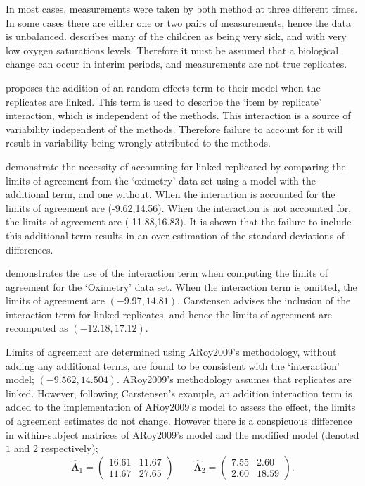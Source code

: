 \documentclass[12pt, a4paper]{report}
\theoremstyle{plain}
\theoremstyle{definition}
\theoremstyle{remark}
\begin{document}
	In most cases, measurements were taken by both method at three different times. In some cases there are either one or two pairs of measurements, hence the data is unbalanced. \citet{BXC2008} describes many of the children as being very sick, and with very low oxygen saturations levels. Therefore it must be assumed that a biological change can occur in interim periods, and measurements are not true replicates.
	
	\citet{BXC2008} proposes the addition of an random effects term to their model when the replicates are linked. This term is used to describe the `item by replicate' interaction, which is independent of the methods. This interaction is a source of variability independent of the methods. Therefore failure to account for it will result in variability being wrongly attributed to the methods.
	
	
	\citet{BXC2008} demonstrate the necessity of accounting for linked replicated by comparing the limits of agreement from the `oximetry' data set using a model with the additional term, and one without. When the interaction is accounted for the limits of agreement are (-9.62,14.56). When the interaction is not accounted for, the limits of agreement are (-11.88,16.83). It is shown that the failure to include this additional term results in an over-estimation of the standard deviations of differences.
	
	
	\citet{BXC2008} demonstrates the use of the interaction term when computing the limits of agreement for the `Oximetry' data set. When the interaction term is omitted, the limits of agreement are $(-9.97, 14.81)$. Carstensen advises the inclusion of the interaction term for linked replicates, and hence the limits of agreement are recomputed as $(-12.18,17.12)$.
	
	
	Limits of agreement are determined using ARoy2009's methodology, without adding any additional terms, are found to be consistent with the `interaction' model; $(-9.562, 14.504 )$. ARoy2009's methodology assumes that replicates are linked. However, following Carstensen's example, an addition interaction term is added to the implementation of ARoy2009's model to assess the effect, the limits of agreement estimates do not change. However there is a conspicuous difference in within-subject matrices of ARoy2009's model and the modified model (denoted $1$ and $2$ respectively);
	\begin{equation}
	\hat{\boldsymbol{\Lambda}}_{1}= \left(\begin{array}{cc}
	16.61 &	11.67\\
	11.67 & 27.65 \end{array}\right) \qquad
	\boldsymbol{\hat{\Lambda}}_{2}= \left( \begin{array}{cc}
	7.55 & 2.60 \\
	2.60 & 18.59 \end{array} \right).
	\end{equation}
	
\end{document}
